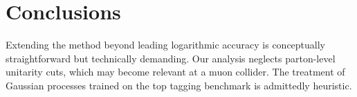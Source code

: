 \section{Conclusions}\label{sec:conclusions}

Extending the method beyond leading logarithmic accuracy is conceptually
straightforward but technically demanding. Our analysis neglects
parton-level unitarity cuts, which may become relevant at a muon
collider. The treatment of Gaussian processes trained on the top tagging
benchmark is admittedly heuristic.

